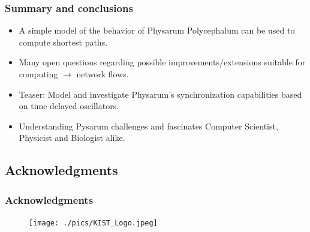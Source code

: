 \documentclass[	hyperref={pdfpagelabels=false}, xcolor=dvipsnames,
		11pt]{beamer}
\begin{document}
\begin{frame}
    \frametitle{Summary and conclusions}   

    \begin{alertblock}{}
    \begin{itemize}
     \item A simple model of the behavior of Physarum Polycephalum can be used to compute shortest paths.
     \item Many open questions regarding possible improvements/extensions suitable for computing $\longrightarrow$ network flows.
     \item Teaser: Model and investigate Physarum's synchronization capabilities based on time delayed oscillators.
     \item Understanding Pysarum challenges and fascinates Computer Scientist, Physicist and Biologist alike.
    \end{itemize}
    \end{alertblock}
 


\end{frame}


\subsection{Acknowledgments}

\begin{frame}
    \frametitle{Acknowledgments}   

    \begin{figure}
        
       \begin{center}

	    \texttt{[image: ./pics/KIST\_Logo.jpeg]}
	
	   

      \end{center}

      \end{figure}


\end{frame}
\end{document}
